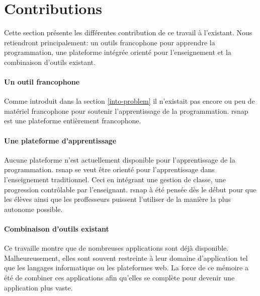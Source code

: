 \section{Contributions}
\label{intro-contribution}
Cette section présente les différentes contribution de ce travail à l'existant. Nous retiendront principalement: un outils francophone pour apprendre la programmation, une plateforme intégrée orienté pour l'enseignement et la combinaison d'outils existant.

\paragraph{Un outil francophone} Comme introduit dans la section \ref{into-problem} il n'existait pas encore ou peu de matériel francophone pour soutenir l'apprentissage de la programmation. \gls{rsnap} est une plateforme entièrement francophone.%

\paragraph{Une plateforme d'apprentissage} Aucune plateforme n'est actuellement disponible pour l'apprentissage de la programmation. \gls{rsnap} se veut être orienté pour l'apprentissage dans l'enseignement traditionnel. Ceci en intégrant une gestion de classe, une progression contrôlable par l'enseignant. \gls{rsnap} à été pensée dès le début pour que les élèves ainsi que les proffesseurs puissent l'utiliser de la manière la plus autonome possible.

\paragraph{Combinaison d'outils existant} Ce travaille montre que de nombreuses applications sont déjà disponible. Malheureusement, elles sont souvent restreinte à leur domaine d'application tel que les langages informatique ou les plateformes web. La force de ce mémoire a été de combiner ces applications afin qu'elles se complète pour devenir une application plus vaste.
